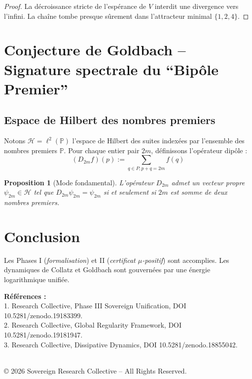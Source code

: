 \documentclass[12pt]{article}
\newtheorem{proposition}{Proposition}
\begin{document}
\begin{proof}
La décroissance stricte de l’espérance de $V$ interdit une divergence vers l’infini. La chaîne tombe presque sûrement dans l’attracteur minimal $\{1,2,4\}$.
\end{proof}

\section{Conjecture de Goldbach -- Signature spectrale du ``Bipôle Premier''}

\subsection{Espace de Hilbert des nombres premiers} 
Notons $\mathcal H = \ell^2(\mathbb P)$ l’espace de Hilbert des suites indexées par l’ensemble des nombres premiers $\mathbb P$.
Pour chaque entier pair $2m$, définissons l’opérateur dipôle :
$$(D_{2m}f)(p) := \sum_{q \in P, p+q=2m} f(q)$$

\begin{proposition}[Mode fondamental] 
L’opérateur $D_{2m}$ admet un vecteur propre $\psi_{2m} \in \mathcal H$ tel que $D_{2m}\psi_{2m} = \psi_{2m}$ si et seulement si $2m$ est somme de deux nombres premiers.
\end{proposition}

\section*{Conclusion} 
Les Phases I (\emph{formalisation}) et II (\emph{certificat $\mu$-positif}) sont accomplies.
Les dynamiques de Collatz et Goldbach sont gouvernées par une énergie logarithmique unifiée.

\bigskip 
\noindent\textbf{Références :}\\ 
1. Research Collective, Phase III Sovereign Unification, DOI 10.5281/zenodo.19183399. \\
2. Research Collective, Global Regularity Framework, DOI 10.5281/zenodo.19181947. \\
3. Research Collective, Dissipative Dynamics, DOI 10.5281/zenodo.18855042.

\medskip
{} \\
© 2026 Sovereign Research Collective -- All Rights Reserved.
\end{document}
